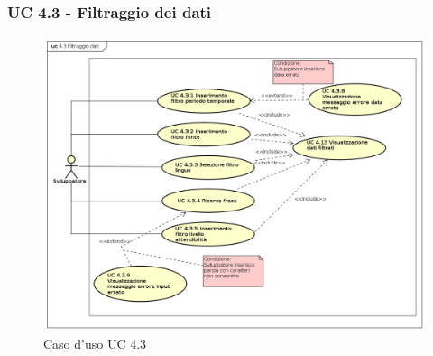 \subsubsection{UC 4.3 - Filtraggio dei dati}
\begin{figure}[H]
	\centering
	\includegraphics[width=14cm, keepaspectratio]{img/UC430.png} 
	\caption{Caso d'uso UC 4.3}\label{fig:430}
\end{figure}
